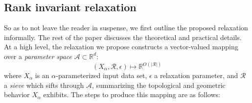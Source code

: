 \documentclass[10pt]{article}
\numberwithin{equation}{section}
\newcommand{\+}{%
	\raisebox{0.18ex}{\scaleobj{0.55}{+}}
}
\theoremstyle{definition}
\theoremstyle{definition}
\begin{document}
\subsection*{Rank invariant relaxation}\label{sec:rank_invariant_summary}
So as to not leave the reader in suspense, we first outline the proposed relaxation informally. The rest of the paper discusses the theoretical and practical details. At a high level, the relaxation we propose constructs a vector-valued mapping over a \emph{parameter space} $\mathcal{A} \subset \mathbb{R}^d$: 
\begin{equation}\label{eq:relaxation_mapping}
	(X_\alpha, \mathcal{R}, \epsilon) \mapsto \mathbb{R}^{O(\lvert \mathcal{R} \rvert)}
\end{equation}
where $X_\alpha$ is an $\alpha$-parameterized input data set, $\epsilon$ a relaxation parameter, and $\mathcal{R}$ a \emph{sieve} which sifts through $\mathcal{A}$, summarizing the topological and geometric behavior $X_\alpha$ exhibits. 
The steps to produce this mapping are as follows:
\end{document}

